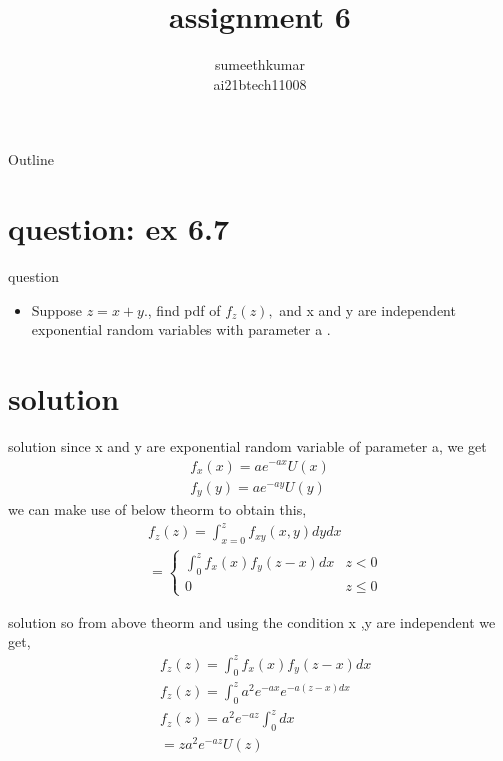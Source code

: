 \documentclass{beamer}
\title{assignment 6 }
\author{sumeethkumar \\
ai21btech11008}
\begin{document}
\begin{frame}
    \titlepage 
\end{frame}
\logo{}
\begin{frame}{Outline}
    \tableofcontents
\end{frame}

\section{question: ex 6.7}
\begin{frame}{question}
\begin{itemize}
    
    \item  Suppose $z=x+y$., find pdf of $f_z(z),$ and x and y are independent 
 exponential random variables with parameter a .
    
\end{itemize}
\end{frame}
\section{solution}
\begin{frame}{solution} 
 since x and y are exponential random variable of parameter a, we get
 \begin{align}
    f_x(x)=a e^{-ax}U(x)\\[8pt]
    f_y(y)= a e^{-ay}U(y)
 \end{align}
 we can make use of below theorm to obtain this,\\
 
 \begin{align}
     &{f_z(z)=\int_{x=0}^z f_{xy}(x,y)dydx}\\[8pt]
     &{=\begin{cases}
      \int_0^z f_x(x) f_y(z-x)dx & z  < 0\\
      0 & z\le 0
      \end{cases}}
      \end{align}
\end{frame}
 \begin{frame}{solution}
 so from above theorm  and using the condition x ,y are independent we get,
 \begin{align}
    & {f_z(z)=\int_0^z f_x(x) f_y(z-x) dx} \\[8pt]
     &{f_z(z)=\int_0^z a^2 e^{-ax} e^{-a(z-x)dx}}\\[8pt]
     &{ f_z(z)=a^2 e^{-az}\int_0^z dx}\\[8pt]
     &{=za^2 e^{-az}U(z)}
     \end{align}
  \end{frame}
\end{document}
